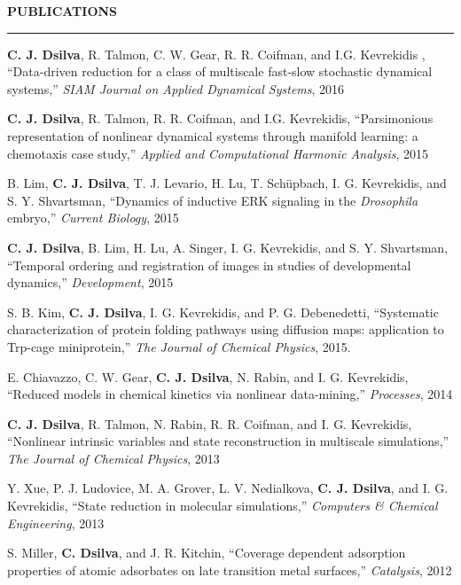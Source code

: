 \documentclass[letterpaper,10pt]{article}
\newenvironment{itemize*}
  {\begin{itemize}
    \setlength{\parskip}{-2pt}}
  {\end{itemize}}
\newcommand{\cvheading}[1]{
\vspace{0.11in}
\noindent
\MakeUppercase{\bf #1}
\vspace{0.06in}
{\hrule height 0.3mm}
\vspace{0.06in}}
\begin{document}
\cvheading{Publications}
\begin{itemize*}
\item {\bf C. J. Dsilva}, R. Talmon, C. W. Gear, R. R. Coifman, and I.G. Kevrekidis , ``Data-driven reduction for a class of multiscale fast-slow stochastic dynamical systems,'' {\em SIAM Journal on Applied Dynamical Systems}, 2016
\item {\bf C. J. Dsilva}, R. Talmon, R. R. Coifman, and I.G. Kevrekidis, ``Parsimonious representation of nonlinear dynamical systems through manifold learning: a chemotaxis case study,'' {\em Applied and Computational Harmonic Analysis}, 2015
\item B. Lim, {\bf C. J. Dsilva}, T. J. Levario, H. Lu, T. Sch\"{u}pbach, I. G. Kevrekidis, and S. Y. Shvartsman, ``Dynamics of inductive ERK signaling in the {\em Drosophila} embryo,'' {\em Current Biology}, 2015
\item {\bf C. J. Dsilva}, B. Lim, H. Lu, A. Singer, I. G. Kevrekidis, and S. Y. Shvartsman, ``Temporal ordering and registration of images in studies of developmental dynamics,'' {\em Development}, 2015
\item S. B. Kim, {\bf C. J. Dsilva}, I. G. Kevrekidis, and P. G. Debenedetti, ``Systematic characterization of protein folding pathways using diffusion maps: application to Trp-cage miniprotein,'' {\em The Journal of Chemical Physics}, 2015. 
\item E. Chiavazzo, C. W. Gear, {\bf C. J. Dsilva}, N. Rabin, and I. G. Kevrekidis, ``Reduced models in chemical kinetics via nonlinear data-mining,'' {\em Processes}, 2014
\item {\bf C. J. Dsilva}, R. Talmon, N. Rabin, R. R. Coifman, and I. G. Kevrekidis, ``Nonlinear intrinsic variables and state reconstruction in multiscale simulations,''
{\em The Journal of Chemical Physics}, 2013
\item Y. Xue, P. J. Ludovice, M. A. Grover, L. V. Nedialkova, {\bf C. J. Dsilva}, and I. G. Kevrekidis, ``State reduction in molecular simulations,'' {\em Computers \& Chemical Engineering}, 2013
\item S. Miller, {\bf C. Dsilva}, and J. R. Kitchin, ``Coverage dependent adsorption properties of atomic adsorbates on late transition metal surfaces,'' {\em Catalysis},  2012
\end{itemize*}
\end{document}
